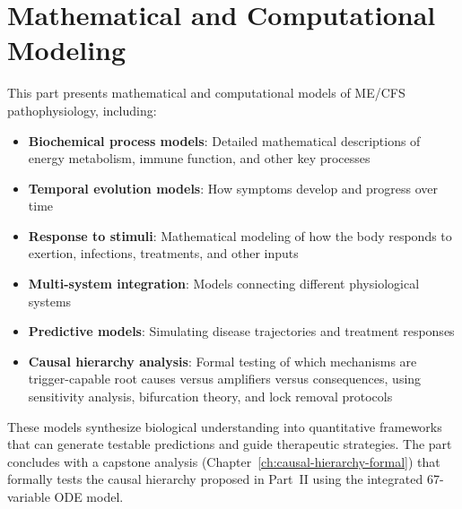 \part{Mathematical and Computational Modeling}
\label{part:modeling}

This part presents mathematical and computational models of ME/CFS pathophysiology, including:

\begin{itemize}
\item \textbf{Biochemical process models}: Detailed mathematical descriptions of energy metabolism, immune function, and other key processes
\item \textbf{Temporal evolution models}: How symptoms develop and progress over time
\item \textbf{Response to stimuli}: Mathematical modeling of how the body responds to exertion, infections, treatments, and other inputs
\item \textbf{Multi-system integration}: Models connecting different physiological systems
\item \textbf{Predictive models}: Simulating disease trajectories and treatment responses
\item \textbf{Causal hierarchy analysis}: Formal testing of which mechanisms are trigger-capable root causes versus amplifiers versus consequences, using sensitivity analysis, bifurcation theory, and lock removal protocols
\end{itemize}

These models synthesize biological understanding into quantitative frameworks that can generate testable predictions and guide therapeutic strategies. The part concludes with a capstone analysis (Chapter~\ref{ch:causal-hierarchy-formal}) that formally tests the causal hierarchy proposed in Part~II using the integrated 67-variable ODE model.

